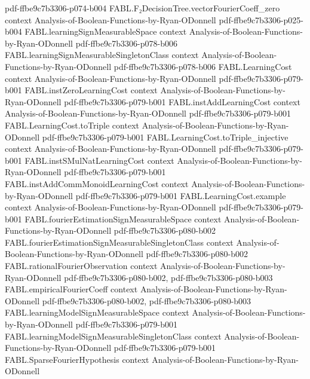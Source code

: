 \begin{theorem}
  {pdf-ffbe9c7b3306-p074-b004}
\proofstep
  {FABL.F₂DecisionTree.vectorFourierCoeff_zero}
  {context}
  {Analysis-of-Boolean-Functions-by-Ryan-ODonnell}
  {pdf-ffbe9c7b3306-p025-b004}
\proofstep
  {FABL.learningSignMeasurableSpace}
  {context}
  {Analysis-of-Boolean-Functions-by-Ryan-ODonnell}
  {pdf-ffbe9c7b3306-p078-b006}
\proofstep
  {FABL.learningSignMeasurableSingletonClass}
  {context}
  {Analysis-of-Boolean-Functions-by-Ryan-ODonnell}
  {pdf-ffbe9c7b3306-p078-b006}
\proofstep
  {FABL.LearningCost}
  {context}
  {Analysis-of-Boolean-Functions-by-Ryan-ODonnell}
  {pdf-ffbe9c7b3306-p079-b001}
\proofstep
  {FABL.instZeroLearningCost}
  {context}
  {Analysis-of-Boolean-Functions-by-Ryan-ODonnell}
  {pdf-ffbe9c7b3306-p079-b001}
\proofstep
  {FABL.instAddLearningCost}
  {context}
  {Analysis-of-Boolean-Functions-by-Ryan-ODonnell}
  {pdf-ffbe9c7b3306-p079-b001}
\proofstep
  {FABL.LearningCost.toTriple}
  {context}
  {Analysis-of-Boolean-Functions-by-Ryan-ODonnell}
  {pdf-ffbe9c7b3306-p079-b001}
\proofstep
  {FABL.LearningCost.toTriple_injective}
  {context}
  {Analysis-of-Boolean-Functions-by-Ryan-ODonnell}
  {pdf-ffbe9c7b3306-p079-b001}
\proofstep
  {FABL.instSMulNatLearningCost}
  {context}
  {Analysis-of-Boolean-Functions-by-Ryan-ODonnell}
  {pdf-ffbe9c7b3306-p079-b001}
\proofstep
  {FABL.instAddCommMonoidLearningCost}
  {context}
  {Analysis-of-Boolean-Functions-by-Ryan-ODonnell}
  {pdf-ffbe9c7b3306-p079-b001}
\proofstep
  {FABL.LearningCost.example}
  {context}
  {Analysis-of-Boolean-Functions-by-Ryan-ODonnell}
  {pdf-ffbe9c7b3306-p079-b001}
\proofstep
  {FABL.fourierEstimationSignMeasurableSpace}
  {context}
  {Analysis-of-Boolean-Functions-by-Ryan-ODonnell}
  {pdf-ffbe9c7b3306-p080-b002}
\proofstep
  {FABL.fourierEstimationSignMeasurableSingletonClass}
  {context}
  {Analysis-of-Boolean-Functions-by-Ryan-ODonnell}
  {pdf-ffbe9c7b3306-p080-b002}
\proofstep
  {FABL.rationalFourierObservation}
  {context}
  {Analysis-of-Boolean-Functions-by-Ryan-ODonnell}
  {pdf-ffbe9c7b3306-p080-b002,
    pdf-ffbe9c7b3306-p080-b003}
\proofstep
  {FABL.empiricalFourierCoeff}
  {context}
  {Analysis-of-Boolean-Functions-by-Ryan-ODonnell}
  {pdf-ffbe9c7b3306-p080-b002,
    pdf-ffbe9c7b3306-p080-b003}
\proofstep
  {FABL.learningModelSignMeasurableSpace}
  {context}
  {Analysis-of-Boolean-Functions-by-Ryan-ODonnell}
  {pdf-ffbe9c7b3306-p079-b001}
\proofstep
  {FABL.learningModelSignMeasurableSingletonClass}
  {context}
  {Analysis-of-Boolean-Functions-by-Ryan-ODonnell}
  {pdf-ffbe9c7b3306-p079-b001}
\proofstep
  {FABL.SparseFourierHypothesis}
  {context}
  {Analysis-of-Boolean-Functions-by-Ryan-ODonnell}

\end{theorem}
